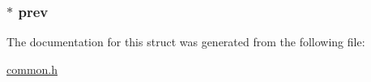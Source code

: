 \subsubsection[{\texorpdfstring{prev}{prev}}]{$\ast$ prev}\hypertarget{struct_interrupt___collection_adb843227cc331b7ed44724902deca22f}{}\label{struct_interrupt___collection_adb843227cc331b7ed44724902deca22f}


The documentation for this struct was generated from the following file\+:\begin{DoxyCompactItemize}
\item 
\hyperlink{common_8h}{common.\+h}\end{DoxyCompactItemize}
